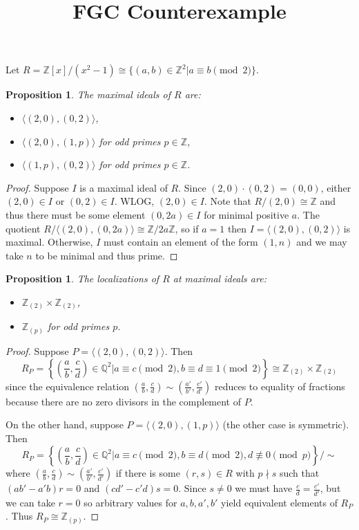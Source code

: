 \documentclass[11pt]{amsart}
\title{FGC Counterexample}
\theoremstyle{plain}
\newtheorem{proposition}[theorem]{Proposition}
\newcommand{\ZZ}{{\mathbb{Z}}}
\newcommand{\QQ}{{\mathbb{Q}}}
\begin{document}
\maketitle
Let $R = \ZZ[x] / (x^2 - 1) \cong \{(a,b) \in \ZZ^2 | a \equiv b \pmod{2}\}$.

\begin{proposition}
The maximal ideals of $R$ are:
\begin{itemize}
\item $\langle (2,0), (0,2) \rangle$,
\item $\langle (2,0), (1,p) \rangle$ for odd primes $p \in \ZZ$,
\item $\langle (1,p), (0,2) \rangle$ for odd primes $p \in \ZZ$.
\end{itemize}
\end{proposition}
\begin{proof}
Suppose $I$ is a maximal ideal of $R$.  Since $(2,0) \cdot (0,2) = (0,0)$, either $(2,0) \in I$ or $(0,2) \in I$.  WLOG, $(2,0) \in I$.  Note that $R / (2,0) \cong \ZZ$ and thus there must be some element $(0,2a) \in I$ for minimal positive $a$.  The quotient $R / \langle (2,0), (0, 2a) \rangle \cong \ZZ / 2a\ZZ$, so if $a = 1$ then $I = \langle (2,0), (0,2) \rangle$ is maximal.  Otherwise, $I$ must contain an element of the form $(1,n)$ and we may take $n$ to be minimal and thus prime.
\end{proof}

\begin{proposition}
The localizations of $R$ at maximal ideals are:
\begin{itemize}
\item $\ZZ_{(2)} \times \ZZ_{(2)}$,
\item $\ZZ_{(p)}$ for odd primes $p$.
\end{itemize}
\end{proposition}
\begin{proof}
Suppose $P = \langle (2,0), (0,2) \rangle$.  Then 
\[
R_P = \left\{\left(\frac{a}{b},\frac{c}{d}\right) \in \QQ^2 | a \equiv c \pmod{2}, b \equiv d \equiv 1 \pmod{2}\right\} \cong \ZZ_{(2)} \times \ZZ_{(2)}
\]
since the equivalence relation $(\frac{a}{b},\frac{c}{d}) \sim (\frac{a'}{b'},\frac{c'}{d'})$ reduces to equality of fractions because there are no zero divisors in the complement of $P$.

On the other hand, suppose $P = \langle (2,0), (1,p) \rangle$ (the other case is symmetric).  Then
\[
R_P = \left\{\left(\frac{a}{b}, \frac{c}{d}\right) \in \QQ^2 | a \equiv c \pmod{2}, b \equiv d \pmod{2}, d \not\equiv 0 \pmod{p}\right\} / \sim
\]
where $(\frac{a}{b}, \frac{c}{d}) \sim (\frac{a'}{b'}, \frac{c'}{d'})$ if  there is some $(r, s) \in R$ with $p \nmid s$ such that $(ab' - a'b)r = 0$ and $(cd' - c'd)s = 0$.  Since $s \ne 0$ we must have $\frac{c}{d} = \frac{c'}{d'}$, but we can take $r = 0$ so arbitrary values for $a, b, a', b'$ yield equivalent elements of $R_P$.  Thus $R_P \cong \ZZ_{(p)}$.
\end{proof}
\end{document}
